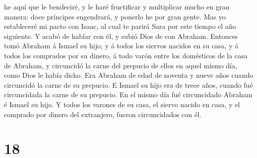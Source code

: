 he aquí que le bendeciré, y le haré fructificar y multiplicar mucho en
gran manera: doce príncipes engendrará, y ponerlo he por gran gente.
 Mas yo estableceré mi pacto con Isaac, al cual te parirá
Sara por este tiempo el año siguiente.  Y acabó de hablar
con él, y subió Dios de con Abraham.  Entonces tomó
Abraham á Ismael su hijo, y á todos los siervos nacidos en su casa, y á
todos los comprados por su dinero, á todo varón entre los domésticos de
la casa de Abraham, y circuncidó la carne del prepucio de ellos en aquel
mismo día, como Dios le había dicho.  Era Abraham de edad
de noventa y nueve años cuando circuncidó la carne de su prepucio.
 E Ismael su hijo era de trece años, cuando fué
circuncidada la carne de su prepucio.  En el mismo día
fué circuncidado Abraham é Ismael su hijo.  Y todos los
varones de su casa, el siervo nacido en casa, y el comprado por dinero
del extranjero, fueron circuncidados con él.

\hypertarget{section-17}{%
\section{18}\label{section-17}}

